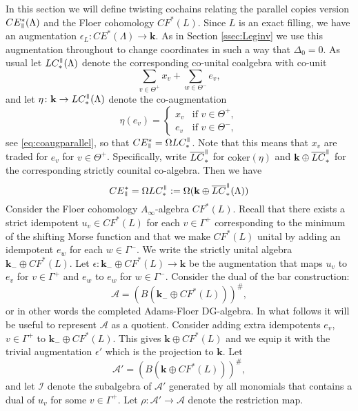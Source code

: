 \documentclass{gtpart}
\renewcommand{\k}{\mathbf{k}}
\newcommand{\A}{\mathscr{A}}
\renewcommand{\parallel}{{\mkern3mu\vphantom{\perp}\vrule depth 0pt\mkern2mu\vrule depth
0pt\mkern3mu}}
\begin{document}
In this section we will define twisting cochains relating the parallel copies version $CE^{\ast}_{\parallel}(\Lambda)$ and the Floer cohomology $CF^{\ast}(L)$. Since $L$ is an exact filling, we have an augmentation $\epsilon_L \colon CE^{\ast}(\Lambda) \to \k$. As in Section \ref{ssec:Leginv} we use this augmentation throughout to change coordinates in such a way
that $\Delta_{0}=0$. As usual let $LC_{\ast}^{\parallel}(\Lambda)$ denote the corresponding co-unital coalgebra with co-unit 
\[ 
\sum_{v\in\Theta^{+}} x_{v} + \sum_{w\in\Theta^{-}} e_{v},
\]
and let $\eta\colon \k\to LC_{\ast}^{\parallel}(\Lambda)$ denote the co-augmentation
\[ 
\eta(e_{v})=
\begin{cases}
x_{v} &\text{if $v\in\Theta^{+}$},\\
e_{v} &\text{if $v\in\Theta^{-}$},
\end{cases}
\]
see \eqref{eq:coaugparallel},
so that $CE^{\ast}_{\parallel} = \Omega LC_{\ast}^{\parallel} $. Note that this
means that $x_v$ are traded for $e_v$ for $v \in \Theta^+$. Specifically, write
$\overline{LC}_{\ast}^{\parallel}$ for $\mathrm{coker}(\eta)$ and $\k\oplus
\overline{LC}_{\ast}^{\parallel}$ for the corresponding strictly counital co-algebra. Then
we have \[ 
CE^{\ast}_{\parallel} = \Omega LC_{\ast}^{\parallel} := \Omega(\k\oplus\overline{LC}_{\ast}^{\parallel}(\Lambda))
\]
Consider the Floer cohomology $A_{\infty}$-algebra $CF^{\ast}(L)$. Recall that there exists a strict
idempotent $u_{v}\in CF^{\ast}(L)$ for each $v\in\Gamma^{+}$ corresponding to the minimum of the
shifting Morse function and that we make $CF^{\ast}(L)$ unital by adding an idempotent $e_{w}$ for each $w\in\Gamma^{-}$. We write the strictly unital algebra $\k_{-}\oplus CF^{\ast}(L)$. Let $\epsilon\colon \k_{-}\oplus CF^{\ast}(L)\to \k$ be the augmentation that maps $u_{v}$ to $e_{v}$ for $v\in\Gamma^{+}$ and $e_{w}$ to $e_{w}$ for $w\in\Gamma^{-}$. Consider the dual of the bar construction:
\[ 
\A=(B(\k_{-}\oplus CF^{\ast}(L)))^{\#},
\]
or in other words the completed Adams-Floer DG-algebra. In what follows it will be useful to represent $\A$ as a quotient. Consider adding extra idempotents $e_{v}$, $v\in\Gamma^{+}$ to $\k_{-}\oplus CF^{\ast}(L)$. This gives $\k\oplus CF^{\ast}(L)$ and we equip it with the trivial augmentation $\epsilon'$ which is the projection to $\k$. Let
\[ 
\A'=(B(\k\oplus CF^{\ast}(L)))^{\#},
\] 
and let $\mathscr{I}$ denote the subalgebra of $\A'$ generated by all monomials that contains a dual of $u_{v}$ for some $v\in\Gamma^{+}$. Let $\rho\colon \A'\to\A$ denote the restriction map.
\end{document}
